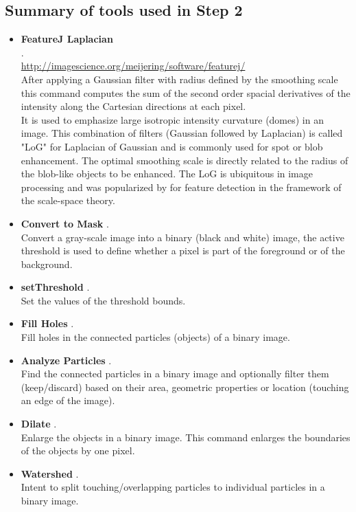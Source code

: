 \subsection{Summary of tools used in Step 2}
\label{summary_of_tools_mod_3_step_2}

\begin{itemize}

\item \textbf{FeatureJ Laplacian}\\
.\\
\url{http://imagescience.org/meijering/software/featurej/}\\
 After applying a Gaussian filter with radius defined by the smoothing scale this command computes the sum of the second order spacial derivatives of the intensity along the Cartesian directions at each pixel. \\
It is used to emphasize large isotropic intensity curvature (domes) in an image. This combination of filters (Gaussian followed by Laplacian) is called "LoG" for Laplacian of Gaussian and is commonly used for spot or blob enhancement. The optimal smoothing scale is directly related to the radius of the blob-like objects to be enhanced. The LoG is ubiquitous in image processing and was popularized by \cite{lindeberg1993scale} for feature detection in the framework of the scale-space theory.

\item \textbf{Convert to Mask} .\\
Convert a gray-scale image into a binary (black and white) image, the active threshold is used to define whether a pixel is part of the foreground or of the background. 

\item \textbf{setThreshold} .\\
Set the values of the threshold bounds.

\item \textbf{Fill Holes} .\\
Fill holes in the connected particles (objects) of a binary image. 

\item \textbf{Analyze Particles}  .\\
Find the connected particles in a binary image and optionally filter them (keep/discard) based on their area, geometric properties or location (touching an edge of the image).

\item \textbf{Dilate} .\\
Enlarge the objects in a binary image. This command enlarges the boundaries of the objects by one pixel. 

\item \textbf{Watershed} .\\
Intent to split touching/overlapping particles to individual particles in a binary image.
\end{itemize}

\newpage
